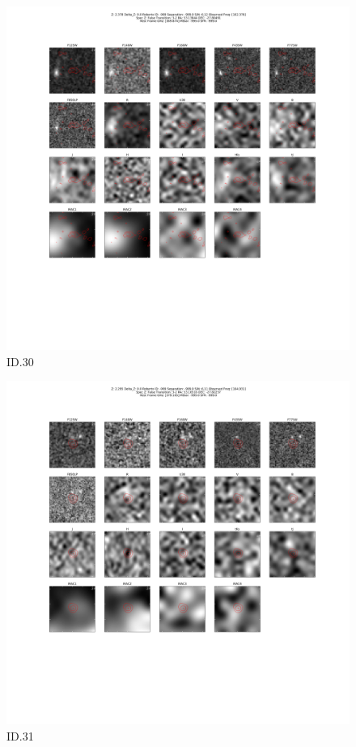 \begin{figure}[tbp]
\centering \includegraphics[width=120mm]{Matched/ASPECS_Cutout_30.png}
\caption{ID.30}
\label{fig:Match_Three}
\end{figure}

\begin{figure}[tbp]
\centering \includegraphics[width=120mm]{Matched/ASPECS_Cutout_31.png}
\caption{ID.31}
\label{fig:Match_Three}
\end{figure}

